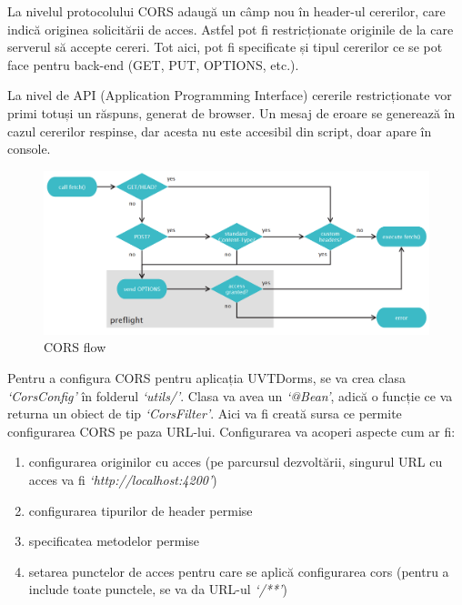 \documentclass[12pt,a4paper]{report}
\theoremstyle{definition}
\theoremstyle{remark}
\begin{document}
\par La nivelul protocolului CORS adaugă un câmp nou în header-ul cererilor, care indică originea solicitării de acces. Astfel pot fi restricționate originile de la care serverul să accepte cereri. Tot aici, pot fi specificate și tipul cererilor ce se pot face pentru back-end (GET, PUT, OPTIONS, etc.).

\par La nivel de API (Application Programming Interface) cererile restricționate vor primi totuși un răspuns, generat de browser. Un mesaj de eroare se generează în cazul cererilor respinse, dar acesta nu este accesibil din script, doar apare în console.

\begin{figure}[H]
    \centering
    \includegraphics[width=1\linewidth]{resurse/diagrame/diagrama_cors.png}
    \caption{CORS flow\cite{gibbinscross}}
\end{figure}

\par Pentru a configura CORS pentru aplicația UVTDorms, se va crea clasa \textit{`CorsConfig'} în folderul \textit{`utils/'}. Clasa va avea un \textit{`@Bean'}, adică o funcție ce va returna un obiect de tip \textit{`CorsFilter'}. Aici va fi creată sursa ce permite configurarea CORS pe paza URL-lui. Configurarea va acoperi aspecte cum ar fi:

\begin{enumerate}
    \item configurarea originilor cu acces (pe parcursul dezvoltării, singurul URL cu acces va fi \textit{`http://localhost:4200'})
    \item configurarea tipurilor de header permise
    \item specificatea metodelor permise
    \item setarea punctelor de acces pentru care se aplică configurarea cors (pentru a include toate punctele, se va da URL-ul \textit{`/**'})
\end{enumerate}
\end{document}
